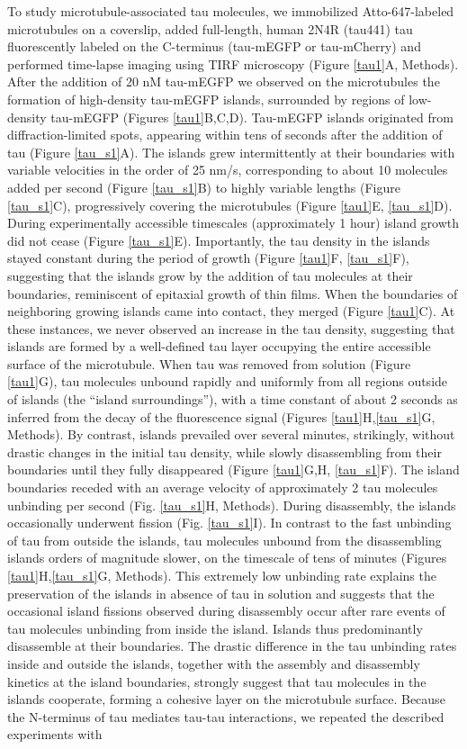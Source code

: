 To study microtubule-associated tau molecules, we immobilized Atto-647-labeled microtubules on a coverslip, added full-length, human 2N4R (tau441) tau fluorescently labeled on the C-terminus (tau-mEGFP or tau-mCherry) and performed time-lapse imaging using TIRF microscopy (Figure \ref{tau1}A, Methods). After the addition of 20 nM tau-mEGFP we observed on the microtubules the formation of high-density tau-mEGFP islands, surrounded by regions of low-density tau-mEGFP (Figures \ref{tau1}B,C,D). Tau-mEGFP islands originated from diffraction-limited spots, appearing within tens of seconds after the addition of tau (Figure \ref{tau_s1}A). The islands grew intermittently at their boundaries with variable velocities in the order of 25 nm/s, corresponding to about 10 molecules added per second (Figure \ref{tau_s1}B) to highly variable lengths (Figure \ref{tau_s1}C), progressively covering the microtubules (Figure \ref{tau1}E, \ref{tau_s1}D). During experimentally accessible timescales (approximately 1 hour) island growth did not cease (Figure \ref{tau_s1}E). Importantly, the tau density in the islands stayed constant during the period of growth (Figure \ref{tau1}F, \ref{tau_s1}F), suggesting that the islands grow by the addition of tau molecules at their boundaries, reminiscent of epitaxial growth of thin films. When the boundaries of neighboring growing islands came into contact, they merged (Figure \ref{tau1}C). At these instances, we never observed an increase in the tau density, suggesting that islands are formed by a well-defined tau layer occupying the entire accessible surface of the microtubule. When tau was removed from solution (Figure \ref{tau1}G), tau molecules unbound rapidly and uniformly from all regions outside of islands (the “island surroundings”), with a time constant of about 2 seconds as inferred from the decay of the fluorescence signal (Figures \ref{tau1}H,\ref{tau_s1}G, Methods). By contrast, islands prevailed over several minutes, strikingly, without drastic changes in the initial tau density, while slowly disassembling from their boundaries until they fully disappeared (Figure \ref{tau1}G,H, \ref{tau_s1}F). The island boundaries receded with an average velocity of approximately 2 tau molecules unbinding per second (Fig. \ref{tau_s1}H, Methods). During disassembly, the islands occasionally underwent fission (Fig. \ref{tau_s1}I). In contrast to the fast unbinding of tau from outside the islands, tau molecules unbound from the disassembling islands orders of magnitude slower, on the timescale of tens of minutes (Figures \ref{tau1}H,\ref{tau_s1}G, Methods). This extremely low unbinding rate explains the preservation of the islands in absence of tau in solution and suggests that the occasional island fissions observed during disassembly occur after rare events of tau molecules unbinding from inside the island. Islands thus predominantly disassemble at their boundaries. The drastic difference in the tau unbinding rates inside and outside the islands, together with the assembly and disassembly kinetics at the island boundaries, strongly suggest that tau molecules in the islands cooperate, forming a cohesive layer on the microtubule surface. Because the N-terminus of tau mediates tau-tau interactions\parencite{Gamblin2003}, we repeated the described experiments with 